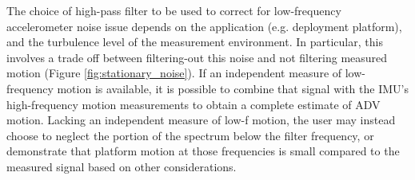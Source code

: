 \documentclass[twocol]{ametsoc}
\begin{document}

The choice of high-pass filter to be used to correct for low-frequency accelerometer noise issue depends on the application (e.g. deployment platform), and the turbulence level of the measurement environment. In particular, this involves a trade off between filtering-out this noise and not filtering measured motion (Figure \ref{fig:stationary_noise}). If an independent measure of low-frequency motion is available, it is possible to combine that signal with the IMU's high-frequency motion measurements to obtain a complete estimate of ADV motion. Lacking an independent measure of low-f motion, the user may instead choose to neglect the portion of the spectrum below the filter frequency, or demonstrate that platform motion at those frequencies is small compared to the measured signal based on other considerations. 
\end{document}
